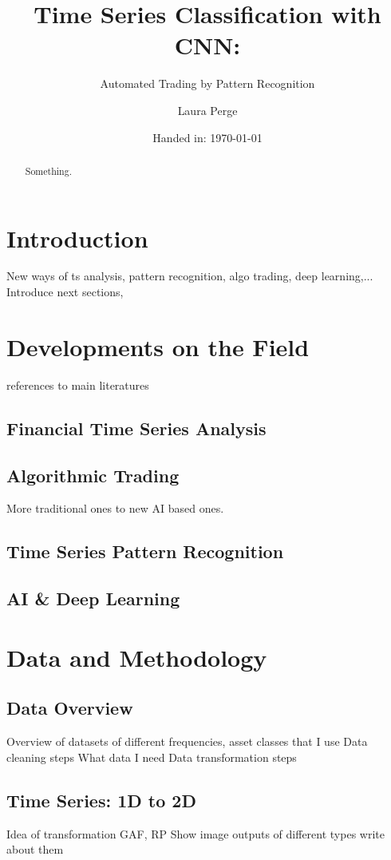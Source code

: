 \documentclass[11pt, a4paper]{article}
\author{Laura Perge}
\title{Time Series Classification with CNN:}
\subtitle{ Automated Trading by Pattern Recognition}
\date{Handed in: \today}
\begin{document}
\maketitle

\tableofcontents

\begin{abstract}
    Something.
\end{abstract}

\section{Introduction}
New ways of ts analysis, pattern recognition, algo trading, deep learning,...
Introduce next sections, 

\section{Developments on the Field}

references to main literatures
\subsection{Financial Time Series Analysis}
\subsection{Algorithmic Trading}
More traditional ones to new AI based ones.
\subsection{Time Series Pattern Recognition}
\subsection{AI \& Deep Learning}


\section{Data and Methodology}
\subsection{Data Overview}
Overview of datasets of different frequencies, asset classes that I use
Data cleaning steps
What data I need
Data transformation steps 

\subsection{Time Series: 1D to 2D}
Idea of transformation
GAF, RP
Show image outputs of different types
write about them 
\end{document}

